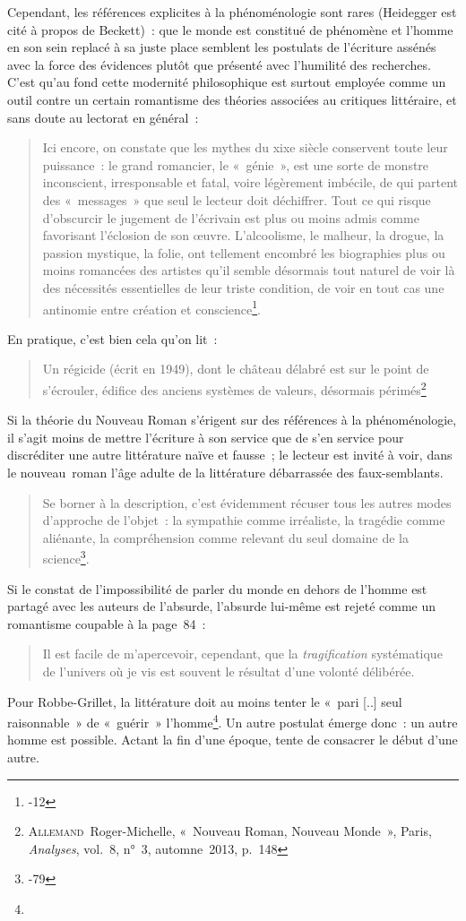 \documentclass[12pt, a4paper]{article}
\begin{document}
Cependant, les références explicites à la phénoménologie sont rares (Heidegger est cité à propos de Beckett)~: que le monde est constitué de phénomène et l'homme en son sein replacé à sa juste place semblent les postulats de l'écriture assénés avec la force des évidences plutôt que présenté avec l'humilité des recherches. C'est qu'au fond cette modernité philosophique est surtout employée comme un outil contre un certain romantisme des théories associées au critiques littéraire, et sans doute au lectorat en général~:
\begin{quote}
    Ici encore, on constate que les mythes du xixe siècle conservent toute leur puissance~: le grand romancier, le «~génie~», est une sorte de monstre inconscient, irresponsable et fatal, voire légèrement imbécile, de qui partent des «~messages~» que seul le lecteur doit déchiffrer. Tout ce qui risque d’obscurcir le jugement de l’écrivain est plus ou moins admis comme favorisant l’éclosion de son œuvre. L’alcoolisme, le malheur, la drogue, la passion mystique, la folie, ont tellement encombré les biographies plus ou moins romancées des artistes qu’il semble désormais tout naturel de voir là des nécessités essentielles de leur triste condition, de voir en tout cas une antinomie entre création et conscience\footnote{-12}.
\end{quote}
En pratique, c'est bien cela qu'on lit~:
\begin{quote}
    Un régicide (écrit en 1949), dont le château délabré est sur le
point de s’écrouler, édifice des anciens systèmes de valeurs,
désormais périmés\footnote{\textsc{Allemand}~Roger-Michelle, «~Nouveau Roman, Nouveau Monde~», Paris, \textit{Analyses}, vol.~8, n°~3, automne~2013, p.~148}
\end{quote}

Si la théorie du Nouveau Roman s'érigent sur des références à la phénoménologie, il s'agit moins de mettre l'écriture à son service que de s'en service pour discréditer une autre littérature naïve et fausse~; le lecteur est invité à voir, dans le nouveau~roman l'âge adulte de la littérature débarrassée des faux-semblants.
\begin{quote}
    Se borner à la description, c’est évidemment récuser tous les autres modes d’approche de l’objet~: la sympathie comme irréaliste, la tragédie comme aliénante, la compréhension comme relevant du seul domaine de la science\footnote{-79}.
\end{quote}

Si le constat de l'impossibilité de parler du monde en dehors de l'homme est partagé avec les auteurs de l'absurde, l'absurde lui-même est rejeté comme un romantisme coupable à la page~84~:
\begin{quote}
    Il est facile de m’apercevoir, cependant, que la \textit{tragification} systématique de l’univers où je vis est souvent le résultat d’une volonté délibérée.
\end{quote}
Pour Robbe-Grillet, la littérature doit au moins tenter le «~pari [..] seul raisonnable~» de «~guérir~» l'homme\footnote{}. Un autre postulat émerge donc~: un autre homme est possible. Actant la fin d'une époque, \punr{} tente de consacrer le début d'une autre.
\end{document}
